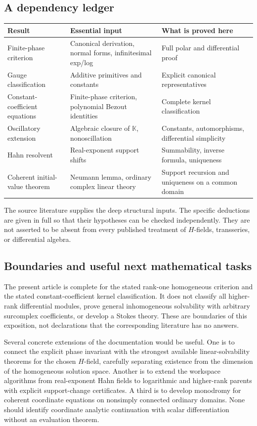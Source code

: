\documentclass[11pt,letterpaper]{article}
\numberwithin{equation}{section}
\theoremstyle{definition}
\theoremstyle{remark}
\newcommand{\K}{\mathbb K}
\begin{document}
\subsection{A dependency ledger}
\begin{center}\small
\begin{tabular}{L{0.28\textwidth}L{0.34\textwidth}L{0.27\textwidth}}
\toprule
Result & Essential input & What is proved here\\
\midrule
Finite-phase criterion & Canonical derivation, normal forms, infinitesimal exp/log & Full polar and differential proof\\
Gauge classification & Additive primitives and constants & Explicit canonical representatives\\
Constant-coefficient equations & Finite-phase criterion, polynomial Bezout identities & Complete kernel classification\\
Oscillatory extension & Algebraic closure of $\K$, nonoscillation & Constants, automorphisms, differential simplicity\\
Hahn resolvent & Real-exponent support shifts & Summability, inverse formula, uniqueness\\
Coherent initial-value theorem & Neumann lemma, ordinary complex linear theory & Support recursion and uniqueness on a common domain\\
\bottomrule
\end{tabular}
\end{center}

The source literature supplies the deep structural inputs. The specific deductions are given in full so that their hypotheses can be checked independently. They are not asserted to be absent from every published treatment of $H$-fields, transseries, or differential algebra.

\subsection{Boundaries and useful next mathematical tasks}
The present article is complete for the stated rank-one homogeneous criterion and the stated constant-coefficient kernel classification. It does not classify all higher-rank differential modules, prove general inhomogeneous solvability with arbitrary surcomplex coefficients, or develop a Stokes theory. These are boundaries of this exposition, not declarations that the corresponding literature has no answers.

Several concrete extensions of the documentation would be useful. One is to connect the explicit phase invariant with the strongest available linear-solvability theorems for the chosen $H$-field, carefully separating existence from the dimension of the homogeneous solution space. Another is to extend the workspace algorithms from real-exponent Hahn fields to logarithmic and higher-rank parents with explicit support-change certificates. A third is to develop monodromy for coherent coordinate equations on nonsimply connected ordinary domains. None should identify coordinate analytic continuation with scalar differentiation without an evaluation theorem.
\end{document}
